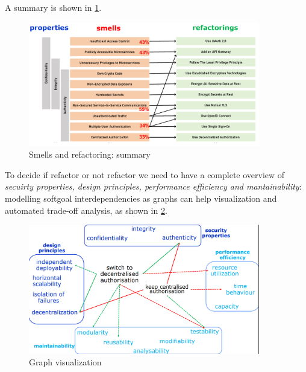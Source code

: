 \documentclass[10pt,a4paper]{report}
\begin{document}
A summary is shown in \ref{image95}.
\begin{figure}[h]
	\centering
	\includegraphics[width=0.9\textwidth]{image95}
	\caption{Smells and refactoring: summary}
	\label{image95}
\end{figure} 

To decide if refactor or not refactor we need to have a complete overview of \textit{secuirty properties, design principles, performance efficiency and mantainability}: modelling softgoal interdependencies as graphs can help visualization and automated trade-off analysis, as shown in \ref{image96}. 
\begin{figure}[h]
	\centering
	\includegraphics[width=0.9\textwidth]{image96}
	\caption{Graph visualization}
	\label{image96}
\end{figure} 
\end{document}
